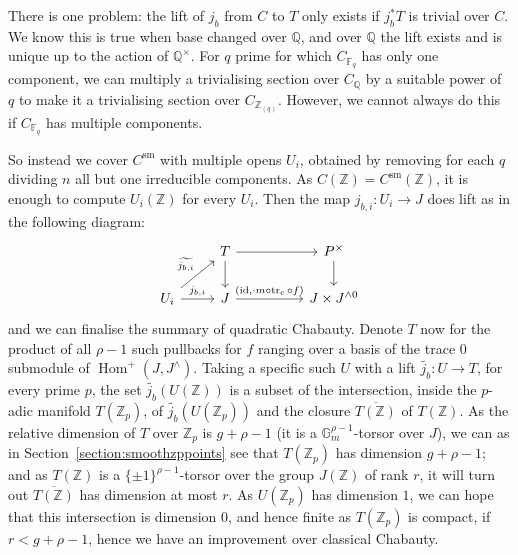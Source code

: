 \documentclass[12pt]{article}
\newcommand{\Z}{\mathbb{Z}}
\renewcommand{\G}{\mathbb{G}}
\newcommand{\Q}{\mathbb{Q}}
\newcommand{\F}{\mathbb{F}}
\DeclareMathOperator{\Hom}{Hom}
\DeclareMathOperator{\id}{id}
\DeclareMathOperator{\tr}{tr}
\DeclareMathOperator{\sm}{sm}
\theoremstyle{plain}
\theoremstyle{definition}
\theoremstyle{remark}
\begin{document}
There is one problem: the lift of $j_b$ from $C$ to $T$ only exists if $j_b^* T$ is trivial over $C$. We know this is true when base changed over $\Q$, and over $\Q$ the lift exists and is unique up to the action of $\Q^\times$. For $q$ prime for which $C_{\F_q}$ has only one component, we can multiply a trivialising section over $C_\Q$ by a suitable power of $q$ to make it a trivialising section over $C_{\Z_{(q)}}$. However, we cannot always do this if $C_{\F_q}$ has multiple components.

So instead we cover $C^{\sm}$ with multiple opens $U_i$, obtained by removing for each $q$ dividing $n$ all but one irreducible components. As $C(\Z) = C^{\sm}(\Z)$, it is enough to compute $U_i(\Z)$ for every $U_i$. Then the map $j_{b,i}: U_i \to J$ does lift as in the following diagram:
\[\begin{tikzcd} %
                                                & T \arrow[d] \arrow[rr]                   && P^\times \arrow[d]      \\
U_i \arrow[ru, "\widetilde{j_{b,i}}"] \arrow[r, "j_{b,i}"] & J \arrow[rr, "{(\id,\cdot m \circ\tr_c \circ f)}"] && J \times J^{\wedge 0}
\end{tikzcd}\]
and we can finalise the summary of quadratic Chabauty. Denote $T$ now for the product of all $\rho-1$ such pullbacks for $f$ ranging over a basis of the trace $0$ submodule of $\Hom^+(J,J^{\wedge})$. Taking a specific such $U$ with a lift $\widetilde{j_b}: U \to T$, for every prime $p$, the set $\widetilde{j_{b}}(U(\Z))$ is a subset of the intersection, inside the $p$-adic manifold $T(\Z_p)$, of $\widetilde{j_b}(U(\Z_p))$ and the closure $\overline{T(\Z)}$ of $T(\Z)$. As the relative dimension of $T$ over $\Z_p$ is $g+\rho-1$ (it is a $\G_m^{\rho-1}$-torsor over $J$), we can as in Section~\ref{section:smoothzppoints} see that $T(\Z_p)$ has dimension $g+\rho-1$; and as $T(\Z)$ is a $\{\pm 1\}^{\rho-1}$-torsor over the group $J(\Z)$ of rank $r$, it will turn out $\overline{T(\Z)}$ has dimension at most $r$. As $U(\Z_p)$ has dimension $1$, we can hope that this intersection is dimension $0$, and hence finite as $T(\Z_p)$ is compact, if $r < g + \rho-1$, hence we have an improvement over classical Chabauty.
\end{document}
